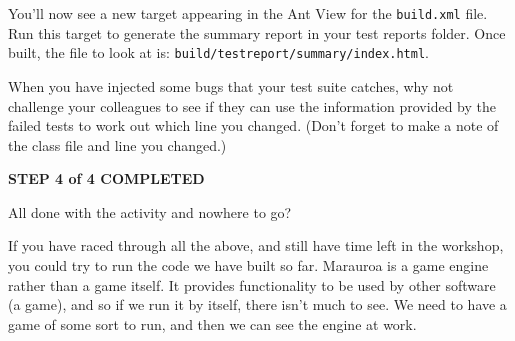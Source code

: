 \documentclass[
]{book}
\newenvironment{Shaded}{\begin{snugshade}}{\end{snugshade}}
\newcommand{\KeywordTok}[1]{\textcolor[rgb]{0.13,0.29,0.53}{\textbf{#1}}}
\newcommand{\OtherTok}[1]{\textcolor[rgb]{0.56,0.35,0.01}{#1}}
\newcommand{\StringTok}[1]{\textcolor[rgb]{0.31,0.60,0.02}{#1}}
\begin{document}
\begin{Shaded}
\end{Shaded}

You'll now see a new target appearing in the Ant View for the \texttt{build.xml} file. Run this target to generate the summary report in your test reports folder. Once built, the file to look at is: \texttt{build/testreport/summary/index.html}.

When you have injected some bugs that your test suite catches, why not challenge your colleagues to see if they can use the information provided by the failed tests to work out which line you changed. (Don't forget to make a note of the class file and line you changed.)

\textbf{STEP 4 of 4 COMPLETED}

All done with the activity and nowhere to go?

If you have raced through all the above, and still have time left in the workshop, you could try to run the code we have built so far. Marauroa is a game engine rather than a game itself. It provides functionality to be used by other software (a game), and so if we run it by itself, there isn't much to see. We need to have a game of some sort to run, and then we can see the engine at work.
\end{document}
